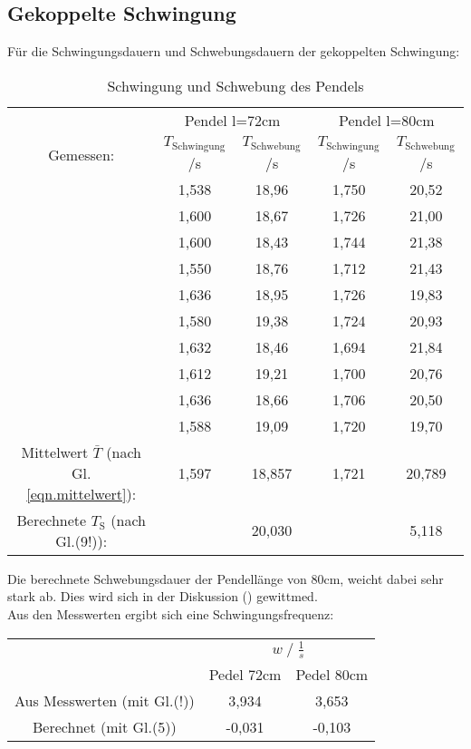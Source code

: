 \subsection{Gekoppelte Schwingung}
Für die Schwingungsdauern und Schwebungsdauern der gekoppelten Schwingung:
\begin{table}
    \centering
    \label{tab:Data_schw}
    \caption{Schwingung und Schwebung des Pendels}
    \begin{tabular}{c c | c || c | c}
        \toprule
        & \multicolumn{2}{c}{Pendel l=72cm} & \multicolumn{2}{c}{Pendel l=80cm} \\
        \cmidrule(lr){2-3}\cmidrule(lr){4-5}
        Gemessen: & $T_\text{Schwingung}$\;/\;s & $T_\text{Schwebung}$\;/\;s & $T_\text{Schwingung}$\;/\;s & $T_\text{Schwebung}$\;/\;s\\
        \midrule
        & 1,538 & 18,96 & 1,750 & 20,52 \\   
        & 1,600 & 18,67 & 1,726 & 21,00 \\
        & 1,600 & 18,43 & 1,744 & 21,38 \\
        & 1,550 & 18,76 & 1,712 & 21,43 \\
        & 1,636 & 18,95 & 1,726 & 19,83 \\
        & 1,580 & 19,38 & 1,724 & 20,93 \\
        & 1,632 & 18,46 & 1,694 & 21,84 \\
        & 1,612 & 19,21 & 1,700 & 20,76 \\
        & 1,636 & 18,66 & 1,706 & 20,50 \\
        & 1,588 & 19,09 & 1,720 & 19,70 \\
        \midrule
        Mittelwert $\bar{T}$ (nach Gl. \ref{eqn.mittelwert}): & 1,597 & 18,857 & 1,721 & 20,789 \\
        Berechnete $T_\textrm{S}$ (nach Gl.(9!)):  &       & 20,030 &       &  5,118 \\
        \bottomrule
    \end{tabular}
\end{table}
Die berechnete Schwebungsdauer der Pendellänge von 80cm, weicht dabei sehr stark ab. Dies wird sich in der Diskussion () gewittmed.\\

Aus den Messwerten ergibt sich eine Schwingungsfrequenz:
\begin{table}
    \centering
    \label{tab:frq_gleichs}
    \begin{tabular}{c c c}
        \toprule
        & \multicolumn{2}{c}{$w\;/\;\frac{1}{s}$}\\
        \cmidrule(lr){2-3} 
        & Pedel 72cm & Pedel 80cm\\
        \midrule
        Aus Messwerten (mit Gl.(!)) & 3,934 & 3,653 \\
        Berechnet (mit Gl.(5))      & -0,031 & -0,103 \\
        \bottomrule
    \end{tabular}
\end{table}

